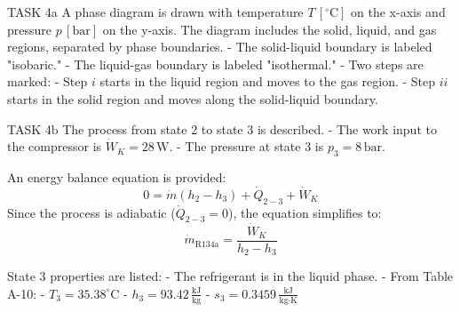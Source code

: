 TASK 4a  
A phase diagram is drawn with temperature \( T \, [^\circ\text{C}] \) on the x-axis and pressure \( p \, [\text{bar}] \) on the y-axis. The diagram includes the solid, liquid, and gas regions, separated by phase boundaries.  
- The solid-liquid boundary is labeled "isobaric."  
- The liquid-gas boundary is labeled "isothermal."  
- Two steps are marked:  
  - Step \( i \) starts in the liquid region and moves to the gas region.  
  - Step \( ii \) starts in the solid region and moves along the solid-liquid boundary.  

TASK 4b  
The process from state 2 to state 3 is described.  
- The work input to the compressor is \( \dot{W}_K = 28 \, \text{W} \).  
- The pressure at state 3 is \( p_3 = 8 \, \text{bar} \).  

An energy balance equation is provided:  
\[
0 = \dot{m} \left( h_2 - h_3 \right) + \dot{Q}_{2-3} + \dot{W}_K
\]  
Since the process is adiabatic (\( \dot{Q}_{2-3} = 0 \)), the equation simplifies to:  
\[
\dot{m}_{\text{R134a}} = \frac{\dot{W}_K}{h_2 - h_3}
\]  

State 3 properties are listed:  
- The refrigerant is in the liquid phase.  
- From Table A-10:  
  - \( T_3 = 35.38^\circ\text{C} \)  
  - \( h_3 = 93.42 \, \frac{\text{kJ}}{\text{kg}} \)  
  - \( s_3 = 0.3459 \, \frac{\text{kJ}}{\text{kg·K}} \)  